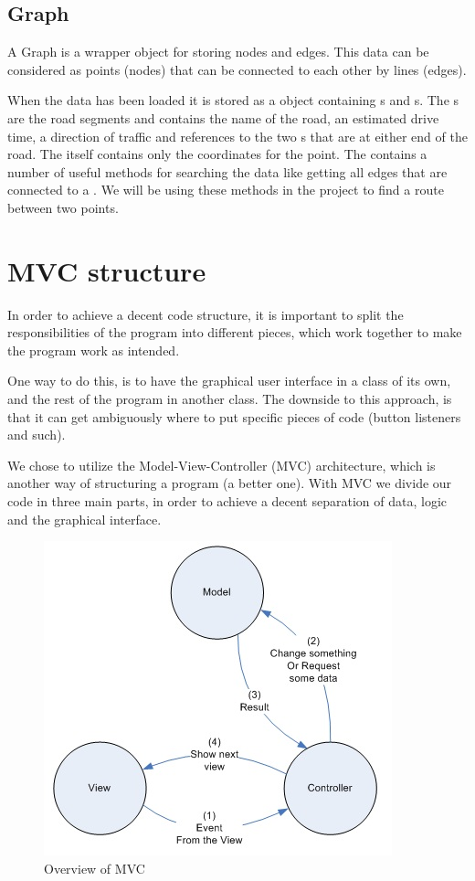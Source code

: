 \subsection{Graph}
\label{BG-DS-G}
A Graph is a wrapper object for storing nodes and edges. This data can
be considered as points (nodes) that can be connected to each other by lines
(edges).

When the data has been loaded it is stored as a  object containing 
s and s. The s are the 
road segments and contains the name of the road, an estimated drive time, 
a direction of traffic and references to the two s that are at 
either end of the road.  The  itself contains only the coordinates 
for the point. The  contains a number of useful methods for 
searching the data like getting all edges that are connected to a
. We will be using these methods in the project to find a
route between two points.
\section{MVC structure}
\label{BG-MVC}
In order to achieve a decent code structure, it is important to split the 
responsibilities of the program into different pieces, which work together 
to make the program work as intended.

One way to do this, is to have the graphical user interface in a class of its
own, and the rest of the program in another class. The downside to this
approach, is that it can get ambiguously where to put specific pieces of code
(button listeners and such).

We chose to utilize the Model-View-Controller (MVC) architecture, which is
another way of structuring a program (a better one). With MVC we divide our code
in three main parts, in order to achieve a decent separation of data, logic and
the graphical interface.

\begin{figure}[h!]
\centering
\includegraphics[width=0.5\linewidth]{images/mvc}
\caption{Overview of MVC}
\label{mvc-overview}
\end{figure}

